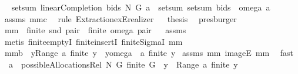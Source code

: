 \begin{isabellebody}
\isamarkupfalse%
\ \isamarkupfalse%
\ {\isachardoublequoteopen}setsum\ {\isacharparenleft}linearCompletion{\isacharprime}\ bids\ N\ G{\isacharparenright}\ a\ {\isacharequal}\ setsum\ {\isacharparenleft}{\isacharparenleft}setsum\ bids{\isacharparenright}\ {\isasymcirc}\ omega{\isacharparenright}\ a{\isachardoublequoteclose}\isanewline
{}\isamarkupfalse%
\ assms\ mm{}{}c\ \isamarkupfalse%
\ {\isacharparenleft}rule\ Extraction{\isachardot}exE{\isacharunderscore}realizer{\isacharparenright}\isanewline
{}\isamarkupfalse%
\ \isamarkupfalse%
\ {\isacharquery}thesis\ \isamarkupfalse%
\ presburger\isanewline
{}\isamarkupfalse%
%
\endisatagproof
{\isafoldproof}%
%
\isadelimproof
\isanewline
%
\endisadelimproof
\isanewline
{}\isamarkupfalse%
\ mm{}{}{\isacharcolon}\ \ {\isachardoublequoteopen}finite\ {\isacharparenleft}snd\ pair{\isacharparenright}{\isachardoublequoteclose}\ \ {\isachardoublequoteopen}finite\ {\isacharparenleft}omega\ pair{\isacharparenright}{\isachardoublequoteclose}%
\isadelimproof
\ %
\endisadelimproof
%
\isatagproof
{}\isamarkupfalse%
\ assms\ \isanewline
{}\isamarkupfalse%
\ {\isacharparenleft}metis\ finite{\isachardot}emptyI\ finite{\isachardot}insertI\ finite{\isacharunderscore}SigmaI\ mm{}{}{\isacharparenright}%
\endisatagproof
{\isafoldproof}%
%
\isadelimproof
%
\endisadelimproof
\isanewline
{}\isamarkupfalse%
\ mm{}{}b{\isacharcolon}\ \ {\isachardoublequoteopen}{\isasymforall}y{\isasymin}{\isacharparenleft}Range\ a{\isacharparenright}{\isachardot}\ finite\ y{\isachardoublequoteclose}\ \ {\isachardoublequoteopen}{\isasymforall}y{\isasymin}{\isacharparenleft}omega\ {\isacharbackquote}\ a{\isacharparenright}{\isachardot}\ finite\ y{\isachardoublequoteclose}\isanewline
%
\isadelimproof
%
\endisadelimproof
%
\isatagproof
{}\isamarkupfalse%
\ assms\ mm{}{}\ imageE\ mm{}{}\ \isamarkupfalse%
\ fast%
\endisatagproof
{\isafoldproof}%
%
\isadelimproof
\isanewline
%
\endisadelimproof
{}\isamarkupfalse%
\ \ {\isachardoublequoteopen}a\ {\isasymin}\ possibleAllocationsRel\ N\ G{\isachardoublequoteclose}\ {\isachardoublequoteopen}finite\ G{\isachardoublequoteclose}\ \ {\isachardoublequoteopen}{\isasymforall}y\ {\isasymin}\ {\isacharparenleft}Range\ a{\isacharparenright}{\isachardot}\ finite\ y{\isachardoublequoteclose}\isanewline

\end{isabellebody}
